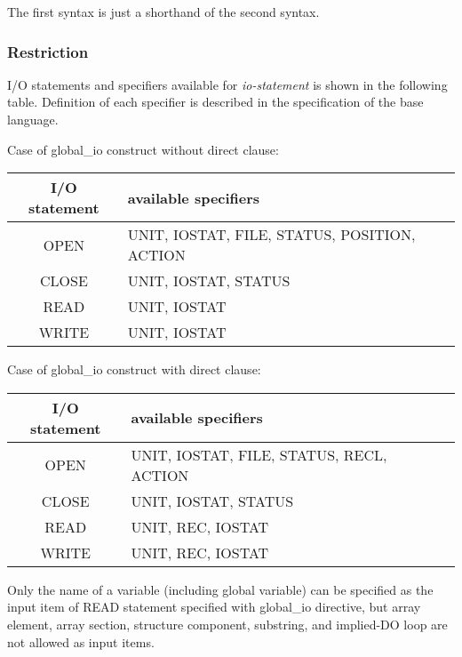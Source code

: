    The first syntax is just a shorthand of the second syntax.

   \subsubsection*{Restriction}

   I/O statements and specifiers available for {\it io-statement} is
   shown in the following table.
   Definition of each specifier is described in the specification of the base language. 

   Case of global\_io construct without direct clause:
   \begin{table}[h]
   \begin{center}
    \label{tb:globalstatement}
    \begin{tabular}{|c||l|}
      \hline
     I/O statement & available specifiers \\ \hline \hline
     OPEN & UNIT, IOSTAT, FILE, STATUS, POSITION, ACTION \\ \hline
     CLOSE & UNIT, IOSTAT, STATUS \\ \hline
     READ & UNIT, IOSTAT \\ \hline
     WRITE & UNIT, IOSTAT \\ \hline
    \end{tabular}
   \end{center}
   \end{table}

   Case of global\_io construct with direct clause:
   \begin{table}[h]
   \begin{center}
    \label{tb:globalstatement}
    \begin{tabular}{|c||l|}
      \hline
     I/O statement & available specifiers \\ \hline \hline
     OPEN & UNIT, IOSTAT, FILE, STATUS, RECL, ACTION \\ \hline
     CLOSE & UNIT, IOSTAT, STATUS \\ \hline
     READ & UNIT, REC, IOSTAT \\ \hline
     WRITE & UNIT, REC, IOSTAT \\ \hline
    \end{tabular}
   \end{center}
   \end{table}

   Only the name of a variable (including global variable) can be specified 
   as the input item of READ statement specified with global\_io directive,
   but array element, array section,
   structure component, substring, and implied-DO loop are not allowed as input items.

